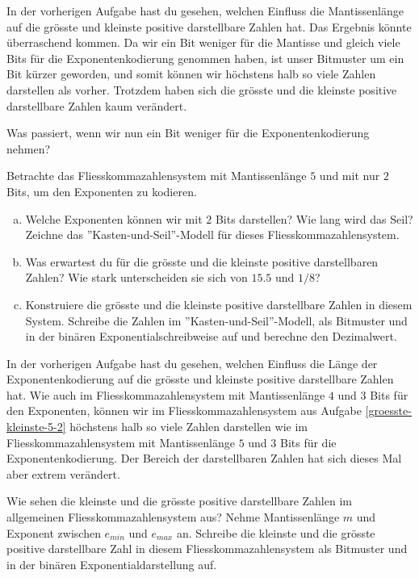 In der vorherigen Aufgabe hast du gesehen, welchen Einfluss die Mantissenlänge auf die grösste und kleinste positive darstellbare Zahlen hat. Das Ergebnis könnte überraschend kommen. Da wir ein Bit weniger für die Mantisse und gleich viele Bits für die Exponentenkodierung genommen haben, ist unser Bitmuster um ein Bit kürzer geworden, und somit können wir höchstens halb so viele Zahlen darstellen als vorher. Trotzdem haben sich die grösste und die kleinste positive darstellbare Zahlen kaum verändert.

Was passiert, wenn wir nun ein Bit weniger für die Exponentenkodierung nehmen?

\begin{aufgabe}\label{groesste-kleinste-5-2}
Betrachte das Fliesskommazahlensystem mit Mantissenlänge \(5\) und mit nur \(2\) Bits, um den Exponenten zu kodieren.
\begin{enumerate}[(a)]
\item Welche Exponenten können wir mit \(2\) Bits darstellen? Wie lang wird das Seil? Zeichne das ''Kasten-und-Seil''-Modell für dieses Fliesskommazahlensystem.
\item Was erwartest du für die grösste und die kleinste positive darstellbaren Zahlen? Wie stark unterscheiden sie sich von \(15.5\) und \(1/8\)?
\item Konstruiere die grösste und die kleinste positive darstellbare Zahlen in diesem System.  Schreibe die Zahlen im ''Kasten-und-Seil''-Modell, als Bitmuster und in der binären Exponentialschreibweise auf und berechne den Dezimalwert.
\end{enumerate}
\end{aufgabe}

In der vorherigen Aufgabe hast du gesehen, welchen Einfluss die Länge der Exponentenkodierung auf die grösste und kleinste positive darstellbare Zahlen hat. Wie auch im Fliesskommazahlensystem mit Mantissenlänge \(4\) und \(3\) Bits für den Exponenten, können wir im Fliesskommazahlensystem aus Aufgabe \ref{groesste-kleinste-5-2} höchstens halb so viele Zahlen darstellen wie im Fliesskommazahlensystem mit Mantissenlänge \(5\) und \(3\) Bits für die Exponentenkodierung. Der Bereich der darstellbaren Zahlen hat sich dieses Mal aber extrem verändert.

\begin{aufgabe}\label{groesste-kleinste-allgemein}
Wie sehen die kleinste und die grösste positive darstellbare Zahlen im allgemeinen Fliesskommazahlensystem aus? Nehme Mantissenlänge \(m\) und Exponent zwischen \(e_{min}\) und \(e_{max}\) an. Schreibe die kleinste und die grösste positive darstellbare Zahl in diesem Fliesskommazahlensystem als Bitmuster und in der binären Exponentialdarstellung auf.
\end{aufgabe}




